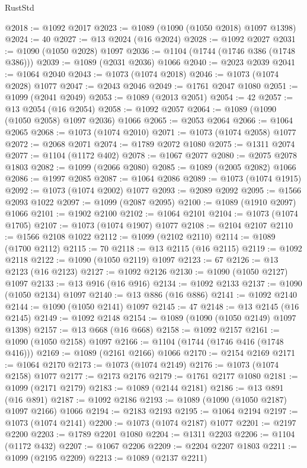 \begin{lexlean}{RustStd}
\begin{coremodule}
{\begin{coremodule}
{{{{{{{{{{{{{{@2018 := @1092 @2017
@2023 := @1089 (@1090 (@1050 @2018) @1097 @1398)
@2024 := 40
@2027 := @13 @2024 (@16 @2024)
@2028 := @1092 @2027
@2031 := @1090 (@1050 @2028) @1097
@2036 := @1104 (@1744 (@1746 @386 (@1748 @386)))
@2039 := @1089 (@2031 @2036) @1066
@2040 := @2023 @2039
@2041 := @1064 @2040
@2043 := @1073 (@1074 @2018)
@2046 := @1073 (@1074 @2028) @1077
@2047 := @2043 @2046
@2049 := @1761 @2047 @1080
@2051 := @1099 (@2041 @2049)
@2053 := @1089 (@2013 @2051)
@2054 := 42
@2057 := @13 @2054 (@16 @2054)
@2058 := @1092 @2057
@2064 := @1089 (@1090 (@1050 @2058) @1097 @2036) @1066
@2065 := @2053 @2064
@2066 := @1064 @2065
@2068 := @1073 (@1074 @2010)
@2071 := @1073 (@1074 @2058) @1077
@2072 := @2068 @2071
@2074 := @1789 @2072 @1080
@2075 := @1311 @2074
@2077 := @1104 (@1172 @402)
@2078 := @1067 @2077
@2080 := @2075 @2078 @1803
@2082 := @1099 (@2066 @2080)
@2085 := @1089 (@2005 @2082) @1066
@2086 := @1997 @2085
@2087 := @1064 @2086
@2089 := @1073 (@1074 @1915)
@2092 := @1073 (@1074 @2002) @1077
@2093 := @2089 @2092
@2095 := @1566 @2093 @1022
@2097 := @1099 (@2087 @2095)
@2100 := @1089 (@1910 @2097) @1066
@2101 := @1902 @2100
@2102 := @1064 @2101
@2104 := @1073 (@1074 @1705)
@2107 := @1073 (@1074 @1907) @1077
@2108 := @2104 @2107
@2110 := @1566 @2108 @1022
@2112 := @1099 (@2102 @2110)
@2114 := @1089 (@1700 @2112)
@2115 := 70
@2118 := @13 @2115 (@16 @2115)
@2119 := @1092 @2118
@2122 := @1090 (@1050 @2119) @1097
@2123 := 67
@2126 := @13 @2123 (@16 @2123)
@2127 := @1092 @2126
@2130 := @1090 (@1050 @2127) @1097
@2133 := @13 @916 (@16 @916)
@2134 := @1092 @2133
@2137 := @1090 (@1050 @2134) @1097
@2140 := @13 @886 (@16 @886)
@2141 := @1092 @2140
@2144 := @1090 (@1050 @2141) @1097
@2145 := 47
@2148 := @13 @2145 (@16 @2145)
@2149 := @1092 @2148
@2154 := @1089 (@1090 (@1050 @2149) @1097 @1398)
@2157 := @13 @668 (@16 @668)
@2158 := @1092 @2157
@2161 := @1090 (@1050 @2158) @1097
@2166 := @1104 (@1744 (@1746 @416 (@1748 @416)))
@2169 := @1089 (@2161 @2166) @1066
@2170 := @2154 @2169
@2171 := @1064 @2170
@2173 := @1073 (@1074 @2149)
@2176 := @1073 (@1074 @2158) @1077
@2177 := @2173 @2176
@2179 := @1761 @2177 @1080
@2181 := @1099 (@2171 @2179)
@2183 := @1089 (@2144 @2181)
@2186 := @13 @891 (@16 @891)
@2187 := @1092 @2186
@2193 := @1089 (@1090 (@1050 @2187) @1097 @2166) @1066
@2194 := @2183 @2193
@2195 := @1064 @2194
@2197 := @1073 (@1074 @2141)
@2200 := @1073 (@1074 @2187) @1077
@2201 := @2197 @2200
@2203 := @1789 @2201 @1080
@2204 := @1311 @2203
@2206 := @1104 (@1172 @432)
@2207 := @1067 @2206
@2209 := @2204 @2207 @1803
@2211 := @1099 (@2195 @2209)
@2213 := @1089 (@2137 @2211)
}}}}}}}}}}}}}}
\end{coremodule}}
\end{coremodule}
\end{lexlean}
